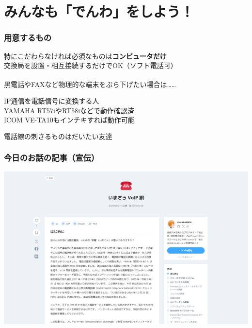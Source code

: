 \documentclass[
  lualatex,
  aspectratio=169,
  14pt
]{beamer}
\begin{document}
\section{みんなも「でんわ」をしよう！}

\begin{frame}
  \frametitle{用意するもの}

  特にこだわらなければ必須なものは\textbf{コンピュータだけ}\\
  \hspace{1.5\zw}交換局を設置・相互接続するだけでOK（ソフト電話可）
  \\~\\[-.5\baselineskip]

  黒電話やFAXなど物理的な端末をぶら下げたい場合は……

  \begin{description}[labelwidth=\linewidth]
    \item[VoIPルータ（ゲートウェイ？）]
      IP通信を電話信号に変換する人\\
      YAMAHA RT57iやRT58iなどで動作確認済\\
      ICOM VE-TA10もインチキすれば動作可能
    \item[端末それ自体]
      電話線の刺さるものはだいたい友達
  \end{description}
\end{frame}

\begin{frame}
  \frametitle{今日のお話の記事（宣伝）}

  \includegraphics[width=\linewidth]{./images/imasara.png}
\end{frame}
\end{document}
